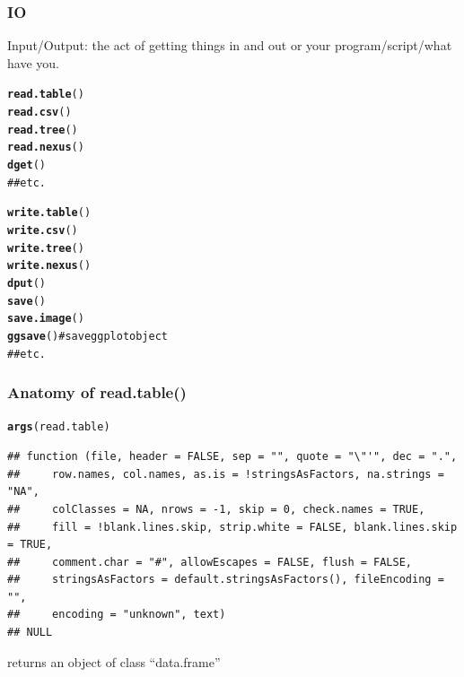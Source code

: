 \documentclass{beamer}\usepackage{graphicx, color}
\makeatletter
\newcommand{\hlfunctioncall}[1]{\textcolor[rgb]{0.501960784313725,0,0.329411764705882}{\textbf{#1}}}%
\newcommand{\hlcomment}[1]{\textcolor[rgb]{0.180392156862745,0.6,0.341176470588235}{#1}}%
\newenvironment{kframe}{%
 \def\at@end@of@kframe{}%
 \ifinner\ifhmode%
  \def\at@end@of@kframe{\end{minipage}}%
  \begin{minipage}{\columnwidth}%
 \fi\fi%
 \def\FrameCommand##1{\hskip\@totalleftmargin \hskip-\fboxsep
 \colorbox{shadecolor}{##1}\hskip-\fboxsep
     \hskip-\linewidth \hskip-\@totalleftmargin \hskip\columnwidth}%
 \MakeFramed {\advance\hsize-\width
   \@totalleftmargin\z@ \linewidth\hsize
   \@setminipage}}%
 {\par\unskip\endMakeFramed%
 \at@end@of@kframe}
\newenvironment{knitrout}{}{} %
\makeatother
\begin{document}
\begin{frame}[fragile]
  \frametitle{IO}

  Input/Output: the act of getting things in and out or your program/script/what have you.

\begin{knitrout}\scriptsize
{}\color{fgcolor}\begin{kframe}
\begin{alltt}
\hlfunctioncall{read.table}()
\hlfunctioncall{read.csv}()
\hlfunctioncall{read.tree}()
\hlfunctioncall{read.nexus}()
\hlfunctioncall{dget}()
\hlcomment{## etc.}

\hlfunctioncall{write.table}()
\hlfunctioncall{write.csv}()
\hlfunctioncall{write.tree}()
\hlfunctioncall{write.nexus}()
\hlfunctioncall{dput}()
\hlfunctioncall{save}()
\hlfunctioncall{save.image}()
\hlfunctioncall{ggsave}() \hlcomment{# save ggplot object}
\hlcomment{## etc.}
\end{alltt}
\end{kframe}
\end{knitrout}


\end{frame}

\begin{frame}[fragile]
  \frametitle{Anatomy of read.table()}
\begin{knitrout}\scriptsize
{}\color{fgcolor}\begin{kframe}
\begin{alltt}
\hlfunctioncall{args}(read.table)
\end{alltt}
\begin{verbatim}
## function (file, header = FALSE, sep = "", quote = "\"'", dec = ".", 
##     row.names, col.names, as.is = !stringsAsFactors, na.strings = "NA", 
##     colClasses = NA, nrows = -1, skip = 0, check.names = TRUE, 
##     fill = !blank.lines.skip, strip.white = FALSE, blank.lines.skip = TRUE, 
##     comment.char = "#", allowEscapes = FALSE, flush = FALSE, 
##     stringsAsFactors = default.stringsAsFactors(), fileEncoding = "", 
##     encoding = "unknown", text) 
## NULL
\end{verbatim}
\end{kframe}
\end{knitrout}


  returns an object of class ``data.frame''

\end{frame}
\end{document}

